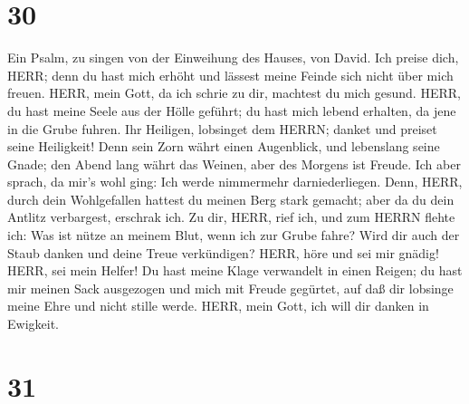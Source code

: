 \hypertarget{section-29}{%
\section{30}\label{section-29}}

 Ein Psalm, zu singen von der Einweihung des Hauses, von
David. Ich preise dich, HERR; denn du hast mich erhöht und lässest meine
Feinde sich nicht über mich freuen.  HERR, mein Gott, da ich
schrie zu dir, machtest du mich gesund.  HERR, du hast meine
Seele aus der Hölle geführt; du hast mich lebend erhalten, da jene in
die Grube fuhren.  Ihr Heiligen, lobsinget dem HERRN; danket
und preiset seine Heiligkeit!  Denn sein Zorn währt einen
Augenblick, und lebenslang seine Gnade; den Abend lang währt das Weinen,
aber des Morgens ist Freude.  Ich aber sprach, da mir's wohl
ging: Ich werde nimmermehr darniederliegen.  Denn, HERR,
durch dein Wohlgefallen hattest du meinen Berg stark gemacht; aber da du
dein Antlitz verbargest, erschrak ich.  Zu dir, HERR, rief
ich, und zum HERRN flehte ich:  Was ist nütze an meinem
Blut, wenn ich zur Grube fahre? Wird dir auch der Staub danken und deine
Treue verkündigen?  HERR, höre und sei mir gnädig! HERR,
sei mein Helfer!  Du hast meine Klage verwandelt in einen
Reigen; du hast mir meinen Sack ausgezogen und mich mit Freude gegürtet,
 auf daß dir lobsinge meine Ehre und nicht stille werde.
HERR, mein Gott, ich will dir danken in Ewigkeit.

\hypertarget{section-30}{%
\section{31}\label{section-30}}

